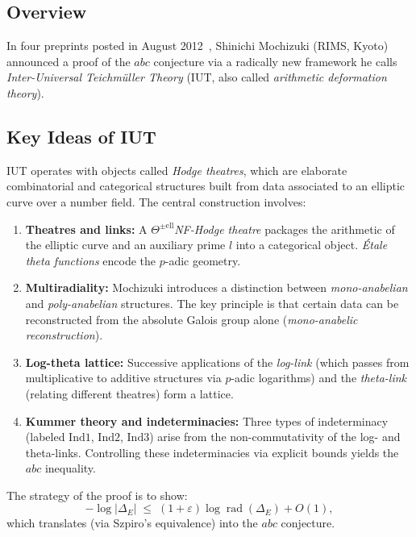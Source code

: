\documentclass[12pt,a4paper]{article}
\theoremstyle{remark}
\begin{document}
\subsection{Overview}

In four preprints posted in August 2012~\cite{Mochizuki2012a,Mochizuki2012b,
Mochizuki2012c,Mochizuki2012d}, Shinichi Mochizuki (RIMS, Kyoto) announced a proof of
the $abc$ conjecture via a radically new framework he calls
\emph{Inter-Universal Teichmüller Theory} (IUT, also called \emph{arithmetic deformation
theory}).

\subsection{Key Ideas of IUT}

IUT operates with objects called \emph{Hodge theatres}, which are elaborate combinatorial
and categorical structures built from data associated to an elliptic curve over a number
field.  The central construction involves:

\begin{enumerate}[nosep]
  \item \textbf{Theatres and links:}  A \emph{$\Theta^{\pm\text{ell}}$NF-Hodge theatre}
    packages the arithmetic of the elliptic curve and an auxiliary prime $l$ into a
    categorical object.  \emph{Étale theta functions} encode the $p$-adic geometry.
  \item \textbf{Multiradiality:}  Mochizuki introduces a distinction between
    \emph{mono-anabelian} and \emph{poly-anabelian} structures.  The key principle is
    that certain data can be reconstructed from the absolute Galois group alone
    (\emph{mono-anabelic reconstruction}).
  \item \textbf{Log-theta lattice:}  Successive applications of the \emph{log-link}
    (which passes from multiplicative to additive structures via $p$-adic logarithms)
    and the \emph{theta-link} (relating different theatres) form a lattice.
  \item \textbf{Kummer theory and indeterminacies:}  Three types of indeterminacy
    (labeled $\mathrm{Ind}1$, $\mathrm{Ind}2$, $\mathrm{Ind}3$) arise from the
    non-commutativity of the log- and theta-links.  Controlling these indeterminacies
    via explicit bounds yields the $abc$ inequality.
\end{enumerate}

The strategy of the proof is to show:
\[
  -\log|\Delta_E| \;\leq\; (1+\varepsilon)\log\operatorname{rad}(\Delta_E) + O(1),
\]
which translates (via Szpiro's equivalence) into the $abc$ conjecture.
\end{document}
